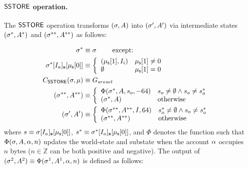 \paragraph{$\mathsf{SSTORE}$ operation.} 
The $\mathsf{SSTORE}$ operation transforms $(\mathbf{\sigma},A)$ into $(\mathbf{\sigma}',A')$ via intermediate states $(\mathbf{\sigma}^{*},A^{*})$ and $(\mathbf{\sigma}^{**},A^{**})$ as follows:

\begin{align}
	\mathbf{\sigma}^{*}   &\equiv \mathbf{\sigma} \qquad \mbox{  except:}\\
	\mathbf{\sigma}^*[I_a]_{\bf s}[\mathbf{\mu}_{\sf s}[0]] &\equiv\left\{
		\begin{array}{ll}
			(\mathbf{\mu}_{\sf s}[1],I_i) & \mathbf{\mu}_{\sf s}[1]\neq 0\\
			\emptyset & \mathbf{\mu}_{\sf s}[1]= 0\\
		\end{array}
	\right.\\			 
	C_{\mathsf{SSTORE}}(\mathbf{\sigma},\mathbf{\mu})  &\equiv G_{sreset} 
\\
	(\mathbf{\sigma}^{**},A^{**}) &\equiv \left\{
		\begin{array}{ll}
			\Phi(\mathbf{\sigma}^*,A,s_o,-64) & s_o \neq \emptyset \wedge s_o\neq s^*_o  \\
			(\mathbf{\sigma}^{*},A) & \text{otherwise}
		\end{array}
	\right.\\
	(\mathbf{\sigma}',A') &\equiv \left\{
		\begin{array}{ll}
			\Phi(\mathbf{\sigma}^{**},A^{**},I,64) & s^*_o \neq \emptyset \wedge s_o\neq s^*_o\\
			(\mathbf{\sigma}^{**},A^{**}) & \text{otherwise}
		\end{array}
	\right.
\end{align}
where $s \equiv \mathbf{\sigma}[I_a]_{\bf s}[\mathbf{\mu}_{\sf s}[0]]$, $s^* \equiv \mathbf{\sigma}^*[I_a]_{\bf s}[\mathbf{\mu}_{\sf s}[0]]$, and $\Phi$ denotes the function such that $\Phi(\mathbf{\sigma},A,\alpha,n)$ updates the world-state and substate when 
the account $\mathbf{\alpha}$ occupies $n$ bytes ($n\in \mathbb{Z}$ can be both positive and negative).
% 
The output of $(\mathbf{\sigma}^2,A^2)\equiv \Phi(\mathbf{\sigma}^1,A^1,\alpha,n)$ is defined as follows: 
%
